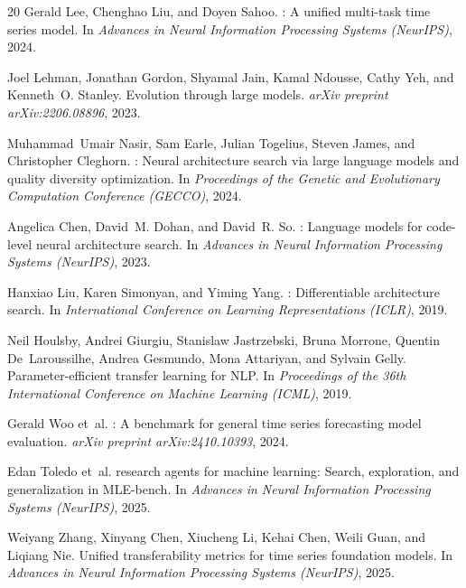 \documentclass{article}
\begin{document}
\begin{thebibliography}{20}
Gerald Lee, Chenghao Liu, and Doyen Sahoo.
: A unified multi-task time series model.
\newblock In \textit{Advances in Neural Information Processing Systems (NeurIPS)}, 2024.

Joel Lehman, Jonathan Gordon, Shyamal Jain, Kamal Ndousse, Cathy Yeh, and Kenneth~O. Stanley.
\newblock Evolution through large models.
\newblock \textit{arXiv preprint arXiv:2206.08896}, 2023.

Muhammad~Umair Nasir, Sam Earle, Julian Togelius, Steven James, and Christopher Cleghorn.
: Neural architecture search via large language models and quality diversity optimization.
\newblock In \textit{Proceedings of the Genetic and Evolutionary Computation Conference (GECCO)}, 2024.

Angelica Chen, David~M. Dohan, and David~R. So.
: Language models for code-level neural architecture search.
\newblock In \textit{Advances in Neural Information Processing Systems (NeurIPS)}, 2023.

Hanxiao Liu, Karen Simonyan, and Yiming Yang.
: Differentiable architecture search.
\newblock In \textit{International Conference on Learning Representations (ICLR)}, 2019.

Neil Houlsby, Andrei Giurgiu, Stanislaw Jastrzebski, Bruna Morrone, Quentin De~Laroussilhe, Andrea Gesmundo, Mona Attariyan, and Sylvain Gelly.
\newblock Parameter-efficient transfer learning for {NLP}.
\newblock In \textit{Proceedings of the 36th International Conference on Machine Learning (ICML)}, 2019.

Gerald Woo et~al.
: A benchmark for general time series forecasting model evaluation.
\newblock \textit{arXiv preprint arXiv:2410.10393}, 2024.

Edan Toledo et~al.
 research agents for machine learning: Search, exploration, and generalization in {MLE}-bench.
\newblock In \textit{Advances in Neural Information Processing Systems (NeurIPS)}, 2025.

Weiyang Zhang, Xinyang Chen, Xiucheng Li, Kehai Chen, Weili Guan, and Liqiang Nie.
\newblock Unified transferability metrics for time series foundation models.
\newblock In \textit{Advances in Neural Information Processing Systems (NeurIPS)}, 2025.


\end{thebibliography}
\end{document}
